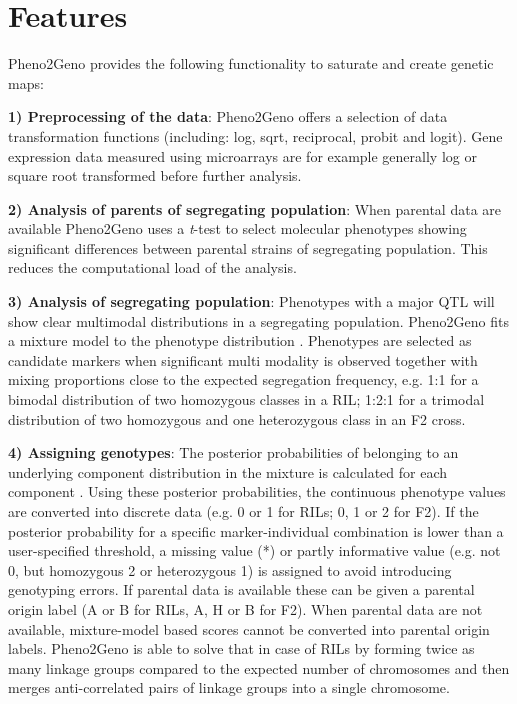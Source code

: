 \section{Features}
Pheno2Geno provides the following functionality to saturate and create genetic maps:

{\bf 1) Preprocessing of the data}: Pheno2Geno offers a selection of 
data transformation functions (including: log, sqrt, reciprocal, probit and logit). 
Gene expression data measured using microarrays are for example generally log 
\cite{Quackenbush:2002} or square root \cite{Jansen:2001a, Gort:2010} transformed before 
further analysis.

{\bf 2) Analysis of parents of segregating population}: When parental data are available 
Pheno2Geno uses a \emph{t}-test to select molecular phenotypes showing significant 
differences between parental strains of segregating population. This reduces the computational load 
of the analysis.

{\bf 3) Analysis of segregating population}:
Phenotypes with a major QTL will show clear multimodal distributions in a segregating 
population. Pheno2Geno fits a mixture model to the phenotype distribution \cite{Jansen:1993, 
Jansen:2001a, Benaglia:2009}. Phenotypes are selected as candidate markers when 
significant multi modality is observed together with mixing proportions close to the expected segregation 
frequency, e.g. 1:1 for a bimodal distribution of two homozygous classes in 
a RIL; 1:2:1 for a trimodal distribution of two homozygous and one heterozygous class in 
an F2 cross.

{\bf 4) Assigning genotypes}:
The posterior probabilities of belonging to an underlying component distribution in the 
mixture is calculated for each component \cite{Jansen:2001b, Benaglia:2009}. Using these 
posterior probabilities, the continuous phenotype values are converted into discrete data 
(e.g. 0 or 1 for RILs; 0, 1 or 2 for F2).  If the posterior probability for a specific 
marker-individual combination is lower than a user-specified threshold, a missing value 
(*) or partly informative value (e.g. not 0, but homozygous 2 or heterozygous 1) is 
assigned to avoid introducing genotyping errors. If parental data is available these can 
be given a parental origin label (A or B for RILs, A, H or B for F2). 
When parental data are not available, mixture-model based scores cannot be converted into 
parental origin labels. Pheno2Geno is able to solve that in case of RILs by forming twice 
as many linkage groups compared to the expected number of chromosomes and then merges 
anti-correlated pairs of linkage groups into a single chromosome.

